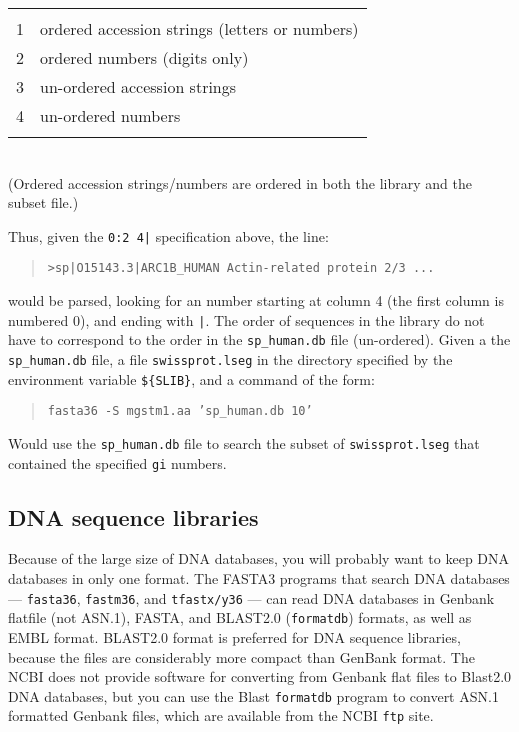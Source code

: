 \documentclass[11pt]{article}
\begin{document}
\begin{tabular}{l l}
\hline\\[-1.5ex]
1 & ordered accession strings  (letters or numbers)\\
2 & ordered numbers (digits only) \\
3 & un-ordered accession strings \\
4 & un-ordered numbers \\
\hline\\
\end{tabular}\\
(Ordered accession strings/numbers are ordered in both the library and the subset file.)

Thus, given the \texttt{0:2 4|} specification above, the line:
\begin{quote}
\texttt{>sp|O15143.3|ARC1B\_HUMAN Actin-related protein 2/3 ...}
\end{quote}
would be parsed, looking for an number starting at column 4 (the first
column is numbered 0), and ending with \texttt{|}. The order of
sequences in the library do not have to correspond to the order in the
\texttt{sp\_human.db} file (un-ordered). Given a the
\texttt{sp\_human.db} file, a file \texttt{swissprot.lseg} in the
directory specified by the environment variable \texttt{\$\{SLIB\}},
and a command of the form:
\begin{quote}
\texttt{fasta36 -S mgstm1.aa 'sp\_human.db 10'}
\end{quote}
Would use the \texttt{sp\_human.db} file to search the subset of
\texttt{swissprot.lseg} that contained the specified \texttt{gi}
numbers.

\subsection{DNA sequence libraries}

Because of the large size of DNA databases, you will probably want to
keep DNA databases in only one format.  The FASTA3 programs that
search DNA databases --- \texttt{fasta36}, \texttt{fastm36}, and
\texttt{tfastx/y36} --- can read DNA databases in Genbank flatfile (not
ASN.1), FASTA, and BLAST2.0 (\texttt{formatdb}) formats, as well as
EMBL format.  BLAST2.0 format is preferred for DNA sequence libraries,
because the files are considerably more compact than GenBank format.
The NCBI does not provide software for converting from Genbank flat
files to Blast2.0 DNA databases, but you can use the Blast
\texttt{formatdb} program to convert ASN.1 formatted Genbank files,
which are available from the NCBI \texttt{ftp} site.
\end{document}
